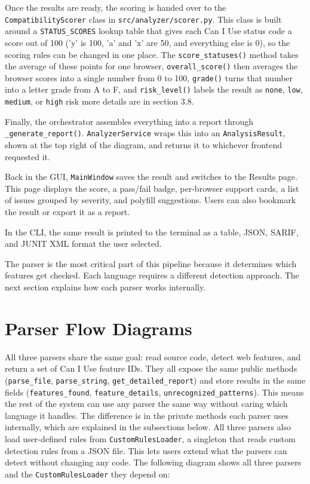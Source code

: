 Once the results are ready, the scoring is handed over to the \texttt{CompatibilityScorer} class in \texttt{src/analyzer/scorer.py}. This class is built around a \texttt{STATUS\_SCORES} lookup table that gives each Can I Use status code a score out of 100 ('y' is 100, 'a' and 'x' are 50, and everything else is 0), so the scoring rules can be changed in one place. The \texttt{score\_statuses()} method takes the average of these points for one browser, \texttt{overall\_score()} then averages the browser scores into a single number from 0 to 100, \texttt{grade()} turns that number into a letter grade from A to F, and \texttt{risk\_level()} labels the result as \texttt{none}, \texttt{low}, \texttt{medium}, or \texttt{high} risk more details are in section 3.8.

Finally, the orchestrator assembles everything into a report through \texttt{\_generate\_report()}. \texttt{AnalyzerService} wraps this into an \texttt{AnalysisResult}, shown at the top right of the diagram, and returns it to whichever frontend requested it.

Back in the GUI, \texttt{MainWindow} saves the result and switches to the Results page. This page displays the score, a pass/fail badge, per-browser support cards, a list of issues grouped by severity, and polyfill suggestions. Users can also bookmark the result or export it as a report.

In the CLI, the same result is printed to the terminal as a table, JSON, SARIF, and JUNIT XML format the user selected.
    
The parser is the most critical part of this pipeline because it determines which features get checked. Each language requires a different detection approach. The next section explains how each parser works internally.

\section{Parser Flow Diagrams}
\label{sec:parser-flows}

All three parsers share the same goal: read source code, detect web features, and return a set of Can I Use feature IDs. They all expose the same public methods (\texttt{parse\_file}, \texttt{parse\_string}, \texttt{get\_detailed\_report}) and store results in the same fields (\texttt{features\_found}, \texttt{feature\_details}, \texttt{unrecognized\_patterns}). This means the rest of the system can use any parser the same way without caring which language it handles. The difference is in the private methods each parser uses internally, which are explained in the subsections below. All three parsers also load user-defined rules from \texttt{CustomRulesLoader}, a singleton that reads custom detection rules from a JSON file. This lets users extend what the parsers can detect without changing any code.
The following diagram shows all three parsers and the \texttt{CustomRulesLoader} they depend on:

